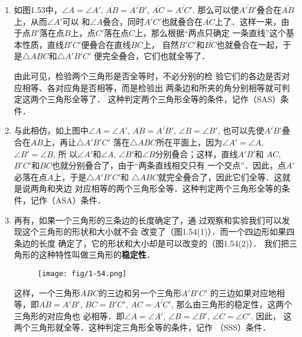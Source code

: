 \begin{enumerate}
	\item 如图1.53中，$\angle A=\angle A'$, $\overline{AB}=\overline{A'B'}$, 
$\overline{AC}=\overline{A'C'}$. 那么可以使$\overline{A'B'}$叠合在$\overline{AB}$上，从而$\angle A'$可以
和$\angle A$叠合，同时$\overline{A'C'}$也就叠合在$\overline{AC}$上了．这样一来，由
于点$B'$落在点$B$上，点$C'$落在点$C$上，那么根据“两点只确定
一条直线”这个基本性质，直线$B'C'$便叠合在直线$BC$上，
自然$\overline{B'C'}$和$\overline{BC}$也就叠合在一起，于是$\triangle ABC$和$\triangle A'B'C'$
便完全叠合，它们也就全等了．
\begin{figure}[htp]
	\centering
{}
	\caption{}
\end{figure}

由此可见，检验两个三角形是否全等时，不必分别的检
验它们的各边是否对应相等、各对应角是否相等，而是检验出
两条边和所夹的角分别相等就可判定这两个三角形全等了．
这种判定两个三角形全等的条件，记作（SAS）条件．

\item 与此相仿，如上图中$\angle A=\angle A'$, $\overline{AB}=\overline{A'B'}$, 
$\angle B=\angle B'$, 也可以先使$\overline{A'B'}$叠合在$\overline{AB}$上，再让$\triangle A'B'C'$
落在$\triangle ABC$所在平面上，因为$\angle A'=\angle A$, $\angle B'=\angle B$, 所
以$\angle A'$和$\angle A$, $\angle B'$和$\angle B$分别叠合；这样，直线$A'B'$和
$AC$, $B'C'$和$BC$也就分别叠合了，由于“两条直线相交只有
一个交点”．因此，点$A'$必落在点$A$上，于是$\triangle A'B'C'$和
$\triangle ABC$就完全叠合了，因此它们全等．这就是说两角和夹边
对应相等的两个三角形全等．这种判定两个三角形全等的条
件，记作（ASA）条件．

\item 再有，如果一个三角形的三条边的长度确定了，通
过观察和实验我们可以发现这个三角形的形状和大小就不会
改变了（图1.54(1)）．而一个四边形如果四条边的长度
确定了，它的形状和大小却是可以改变的（图1.54(2)）．
我们把三角形的这种特性叫做三角形的\textbf{稳定性}．
\begin{figure}[htp]
	\centering
\texttt{[image: fig/1-54.png]}
	\caption{}
\end{figure}

这样，一个三角形$ABC$的三边和另一个三角形$A'B'C'$
的三边如果对应地相等，即$\overline{AB}=\overline{A'B'}$, $\overline{BC}=\overline{B'C'}$, $\overline{AC}=\overline{A'C'}$, 那么由三角形的稳定性，这两个三角形的对应角也
必相等．即$\angle A=\angle A'$, $\angle B=\angle B'$, $\angle C=\angle C'$. 因此，
这两个三角形就全等．这种判定三角形全等的条件，记作
（SSS）条件．
\end{enumerate}

